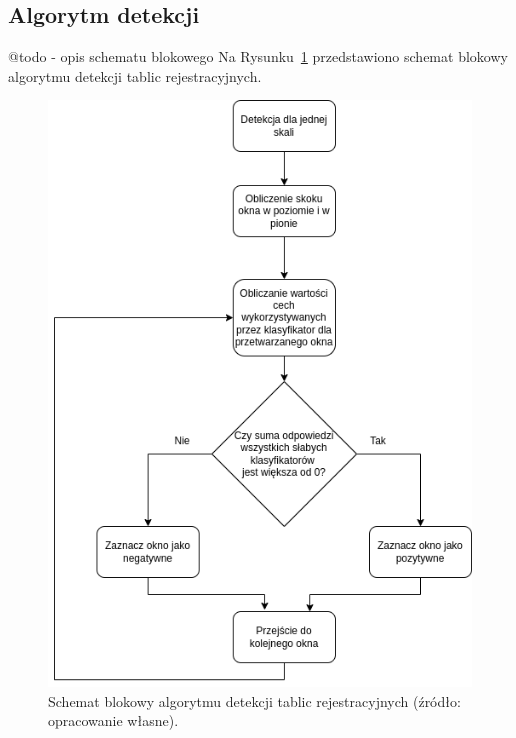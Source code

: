 \subsection{Algorytm detekcji}
@todo - opis schematu blokowego
Na Rysunku~\ref{fig:detection_alg} przedstawiono schemat blokowy algorytmu detekcji tablic rejestracyjnych.
\begin{figure}[!ht]
    \centering
    \includegraphics[scale=0.4]{Pictures/detection_alg}
    \caption{Schemat blokowy algorytmu detekcji tablic rejestracyjnych (źródło: opracowanie własne).}
    \label{fig:detection_alg}
\end{figure}
\FloatBarrier

